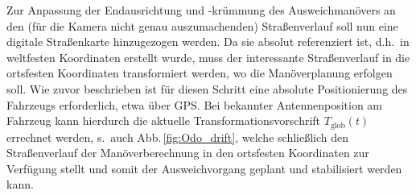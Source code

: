 Zur Anpassung der Endausrichtung und -krümmung des Ausweichmanövers an den (für die Kamera nicht genau auszumachenden) Straßenverlauf soll nun eine digitale Straßenkarte hinzugezogen werden. Da sie absolut referenziert ist, d.h.\ in weltfesten Koordinaten erstellt wurde, muss der interessante Straßenverlauf in die ortsfesten Koordinaten transformiert werden, wo die Manöverplanung erfolgen soll. Wie zuvor beschrieben ist für diesen Schritt eine absolute Positionierung  des Fahrzeugs erforderlich, etwa über GPS. Bei bekannter Antennenposition am Fahrzeug kann hierdurch die aktuelle Transformationsvorschrift $T_\text{glob}(t)$ errechnet werden, s.\ auch Abb.\,\ref{fig:Odo_drift}, welche schließlich  den Straßenverlauf der Manöverberechnung in den ortsfesten Koordinaten zur Verfügung stellt und somit der Ausweichvorgang geplant und stabilisiert werden kann.


